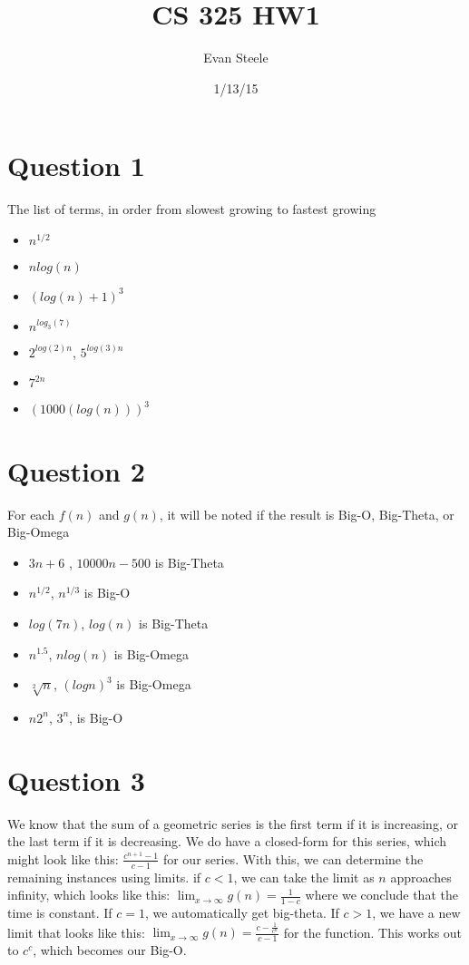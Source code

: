 \documentclass{article}
\title{CS 325 HW1}
\date{1/13/15}
\author{Evan Steele}
\begin{document}
\lstset{language=bash}
\maketitle
{}
\newpage
{}

\section{Question 1}
The list of terms, in order from slowest growing to fastest growing
\begin{itemize}
   \item $n^{1/2}$
   \item $n log(n)$
   \item $(log(n)+1)^{3}$
   \item $n^{log_{3}(7)}$
   \item $2^{log(2)n}$, $5^{log(3)n}$
   \item $7^{2n}$
   \item $(1000(log(n)))^{3}$
\end{itemize}
\section{Question 2}
For each $f(n)$ and $g(n)$, it will be noted if the result is Big-O, Big-Theta, or Big-Omega
\begin{itemize}
   \item $3n+6$ , $10000n-500$ is Big-Theta
   \item $n^{1/2}$, $n^{1/3}$ is Big-O
   \item $log(7n)$, $log(n)$ is Big-Theta
   \item $n^{1.5}$, $nlog(n)$ is Big-Omega
   \item $\sqrt[2]{n}$, $(logn)^{3}$ is Big-Omega
   \item $n2^{n}$, $3^{n}$, is Big-O
\end{itemize}
\section{Question 3}
We know that the sum of a geometric series is the first term if it is increasing, or the last term if it is decreasing. We do have a closed-form for this series, which might look like this: $\frac{c^{n+1}-1}{c-1}$ for our series. With this, we can determine the remaining instances using limits. if $c<1$, we can take the limit as $n$ approaches infinity, which looks like this: $\lim_{x\to\infty} g(n) = \frac{1}{1-c}$ where we conclude that the time is constant. If $c=1$, we automatically get big-theta. If $c>1$, 
we have a new limit that looks like this: $\lim_{x\to\infty} g(n) = \frac{c-\frac{1}{c^{n}}}{c-1}$ for the function. This works out to $c^{c}$, which becomes our Big-O.
\end{document}
